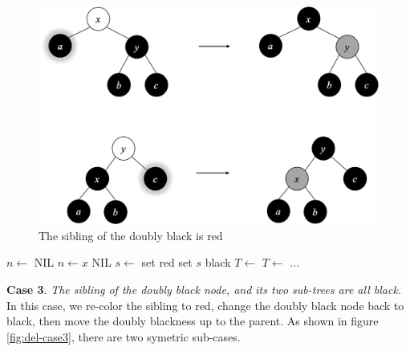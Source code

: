 \documentclass[b5paper]{article}
\begin{document}
\begin{figure}[htbp]
  \centering
  \includegraphics[scale=0.4]{../../../datastruct/tree/red-black-tree/img/del-case3}
  \caption{The sibling of the doubly black is red}
  \label{fig:del-case2}
\end{figure}

\begin{algorithmic}[1]
  \State $n \gets$ NIL
    
    \State $n \gets x$
  \EndIf
   
    \State \Return NIL
  \EndIf
        \State $s \gets$ 
           
          \State set  red
          \State set $s$ black
           
            \State $T \gets$ 
          \Else {}
            \State $T \gets$ 
          \EndIf
          \State ...
        \EndIf
    \EndIf
  \EndWhile
\EndFunction
\end{algorithmic}

\textbf{Case 3}. {\em The sibling of the doubly black node, and its two sub-trees are all black.} In this case, we re-color the sibling to red, change the doubly black node back to black, then move the doubly blackness up to the parent. As shown in figure \cref{fig:del-case3}, there are two symetric sub-cases.
\end{document}
